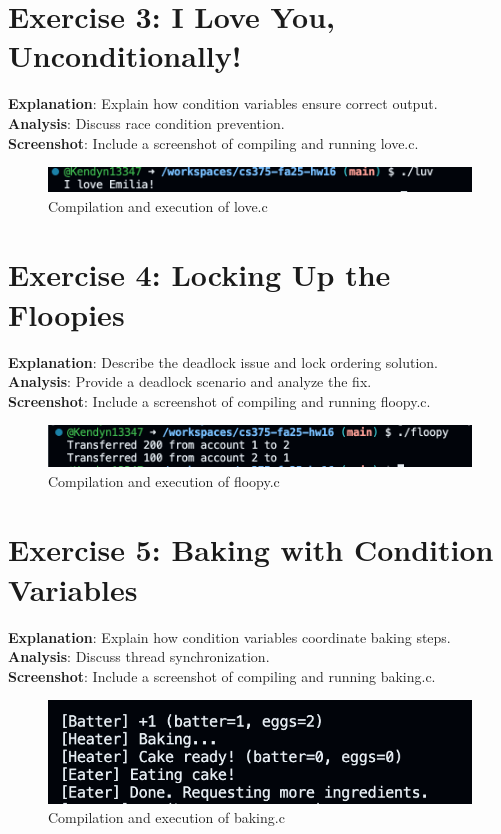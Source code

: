 \documentclass{article}
\begin{document}
\section{Exercise 3: I Love You, Unconditionally!}

\textbf{Explanation}: Explain how condition variables ensure correct output.\\
\textbf{Analysis}: Discuss race condition prevention.\\
\textbf{Screenshot}: Include a screenshot of compiling and running love.c.
\begin{figure}[H]
    \centering
    \includegraphics[width=\textwidth]{love.png}
    \caption{Compilation and execution of love.c}
\end{figure}

\section{Exercise 4: Locking Up the Floopies}

\textbf{Explanation}: Describe the deadlock issue and lock ordering solution.\\
\textbf{Analysis}: Provide a deadlock scenario and analyze the fix.\\
\textbf{Screenshot}: Include a screenshot of compiling and running floopy.c.
\begin{figure}[H]
    \centering
    \includegraphics[width=\textwidth]{floopy.png}
    \caption{Compilation and execution of floopy.c}
\end{figure}

\section{Exercise 5: Baking with Condition Variables}

\textbf{Explanation}: Explain how condition variables coordinate baking steps.\\
\textbf{Analysis}: Discuss thread synchronization.\\
\textbf{Screenshot}: Include a screenshot of compiling and running baking.c.
\begin{figure}[h]
    \centering
    \includegraphics[width=\textwidth]{baking.png}
    \caption{Compilation and execution of baking.c}
\end{figure}
\end{document}
